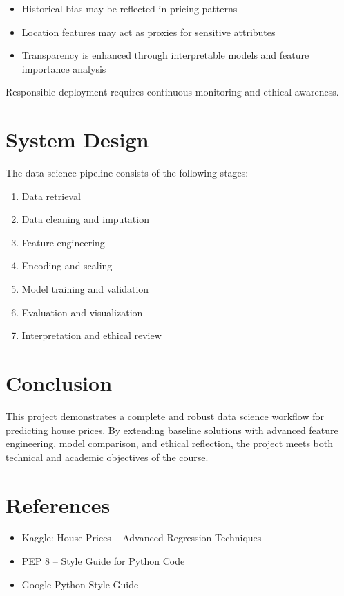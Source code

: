 \documentclass[a4paper]{article}
\begin{document}
\begin{itemize}
    \item Historical bias may be reflected in pricing patterns
    \item Location features may act as proxies for sensitive attributes
    \item Transparency is enhanced through interpretable models and feature importance analysis
\end{itemize}

Responsible deployment requires continuous monitoring and ethical awareness.

\section*{System Design}

The data science pipeline consists of the following stages:

\begin{enumerate}
    \item Data retrieval
    \item Data cleaning and imputation
    \item Feature engineering
    \item Encoding and scaling
    \item Model training and validation
    \item Evaluation and visualization
    \item Interpretation and ethical review
\end{enumerate}

\section*{Conclusion}

This project demonstrates a complete and robust data science workflow for predicting house prices. By extending baseline solutions with advanced feature engineering, model comparison, and ethical reflection, the project meets both technical and academic objectives of the course.

\section*{References}

\begin{itemize}
    \item Kaggle: House Prices – Advanced Regression Techniques
    \item PEP 8 – Style Guide for Python Code
    \item Google Python Style Guide
\end{itemize}
\end{document}

